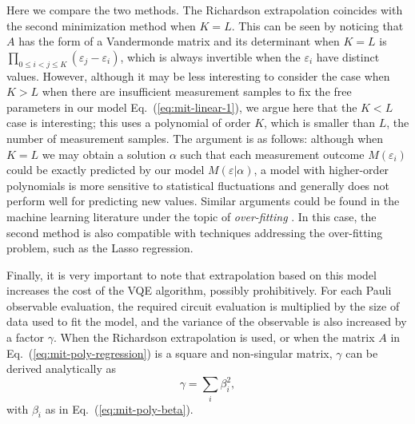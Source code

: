 Here we compare the two methods. The Richardson extrapolation coincides with the second minimization method when $K=L$. This can be seen by noticing that $A$ has the form of a Vandermonde matrix and its determinant when $K=L$ is $\prod _{0\leqslant i< j\leqslant K}( \varepsilon _{j} -\varepsilon _{i})$, which is always invertible when the $\varepsilon _{i}$ have distinct values. However, although it may be less interesting to consider the case when $K>L$ when there are insufficient measurement samples to fix the free parameters in our model Eq.~(\ref{eq:mit-linear-1}), we argue here that the $K<L$ case is interesting; this uses a polynomial of order $K$, which is smaller than $L$, the number of measurement samples. The argument is as follows: although when $K=L$ we may obtain a solution $\alpha $ such that each measurement outcome $M( \varepsilon _{i})$ could be exactly predicted by our model $M( \varepsilon |\alpha )$, a model with higher-order polynomials is more sensitive to statistical fluctuations \cite{giurgica-tironDigitalZeroNoise2020} and generally does not perform well for predicting new values. Similar arguments could be found in the machine learning literature under the topic of \textit{over-fitting }\cite{goodfellowDeepLearning2016}. In this case, the second method is also compatible with techniques addressing the over-fitting problem, such as the Lasso regression\cite{hastie2015statistical}.

Finally, it is very important to note that extrapolation based on this model increases the cost of the VQE algorithm, possibly prohibitively. For each Pauli observable evaluation, the required circuit evaluation is multiplied by the size of data used to fit the model, and the variance of the observable is also increased by a factor $\gamma$. When the Richardson extrapolation is used, or when the matrix $A$ in Eq.~(\ref{eq:mit-poly-regression}) is a square and non-singular matrix, $\gamma$ can be derived analytically \cite{suguru2019a,temmeErrorMitigationShortDepth2017} as
\begin{equation}\label{eq:mit-poly-variance-amplification}
    \gamma = \sum_i \beta_i^2,
\end{equation}
with $\beta_i$ as in Eq.~(\ref{eq:mit-poly-beta}).

